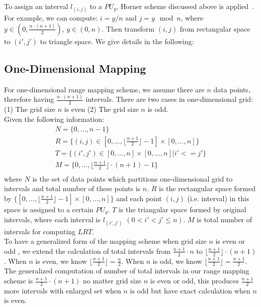 \documentclass[AMA,LATO1COL]{WileyNJD-v2}
\begin{document}
To assign an interval $l_(i,j)$ to a $PU_y$, Horner scheme discussed above is applied~\cite{horner}. For example, we can compute: $i=y/n$ and $j= y \mod n$, where    $y \in (0,{\frac{n \cdot (n+1)}{2}})$, $y \in(0,n)$. Then transform $(i,j)$ from rectangular space to $(i',j')$  to triangle space. We give details in the following:

\subsection{One-Dimensional Mapping}
For one-dimensional range mapping scheme, we assume there are $n$ data points, therefore having ${\frac{n \cdot (n+1)}{2}}$ intervals. There are two cases in one-dimensional grid: (1) The grid size $n$ is even (2) The grid size $n$ is odd. \\

Given the following information:
\begin{eqnarray}
& N = \{0,...,n-1\}               & \\
& R = \{(i,j)\in [0,...,\lfloor \frac{n+1}{2}\rfloor -1] \times [0,...,n]\}     &\\
& T = \{(i',j') \in [0,...,n] \times [0,...,n] | i'<=j'\}   &\\
& M = \{0,..., \lfloor \frac{n+1}{2}\rfloor \cdot (n+1)-1\}  &\\
\end{eqnarray}
where  $ N$ is the set of data points which partitions one-dimensional grid to intervals and total number of these points is $n$. $ R$ is the rectangular space formed by $\{[0,...,\lfloor \frac{n+1}{2}\rfloor -1]\times [0,...,n]\}$ and each point $(i,j)$ (i.e. interval) in this space is assigned to a certain $PU_y$. $T$ is the triangular space formed by original intervals, where each interval is $l_(i',j')$ $(0<i'<j'\leq n)$. $ M$ is total number of  intervals for computing $LRT$.\\
 To have a generalized form of the mapping scheme when grid size $n$ is even or odd , we extend the calculation of total intervals from $\frac{n+1}{2} \cdot n$ to $\lfloor \frac{n+1}{2}\rfloor \cdot (n+1)$. When $n$ is even, we know $\lfloor \frac{n+1}{2}\rfloor =\frac{n}{2}$. When $n$ is odd, we know $\lfloor \frac{n+1}{2}\rfloor= \frac{n+1}{2}$. The generalized computation of number of total intervals in our range mapping scheme is $\frac{n+1}{2} \cdot (n+1) $ no matter grid size $n$ is even or odd, this produces $\frac{n+1}{2}$ more intervals with enlarged set when $n$ is odd but have exact calculation when $n$ is even. \\
\end{document}
